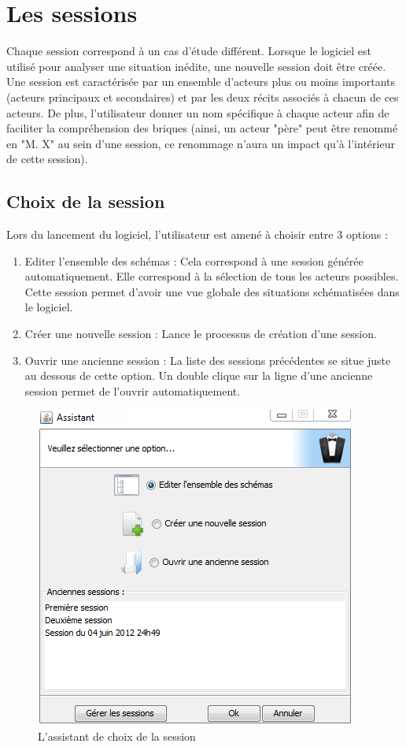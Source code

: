 \chapter{Les sessions}

Chaque session correspond à un cas d'étude différent. Lorsque le logiciel est utilisé pour analyser une situation inédite, une nouvelle session doit être créée.\\

Une session est caractérisée par un ensemble d'acteurs plus ou moins importants (acteurs principaux et secondaires) et par les deux récits associés à chacun de ces acteurs. De plus, l'utilisateur donner un nom spécifique à chaque acteur afin de faciliter la compréhension des briques (ainsi, un acteur "père" peut être renommé en "M. X" au sein d'une session, ce renommage n'aura un impact qu'à l'intérieur de cette session).\\

\section{Choix de la session}
Lors du lancement du logiciel, l'utilisateur est amené à choisir entre 3 options :\\
\begin{enumerate}
\item Editer l'ensemble des schémas : Cela correspond à une session générée automatiquement. Elle correspond à la sélection de tous les acteurs possibles. Cette session permet d'avoir une vue globale des situations schématisées dans le logiciel.
\item Créer une nouvelle session : Lance le processus de création d'une session.
\item Ouvrir une ancienne session : La liste des sessions précédentes se situe juste au dessous de cette option. Un double clique sur la ligne d'une ancienne session permet de l'ouvrir automatiquement.
\end{enumerate}

\begin{figure}[h!]
\centering
\includegraphics[scale=0.55]{images/ouverture_session.png}

\caption{L'assistant de choix de la session}
\end{figure}

